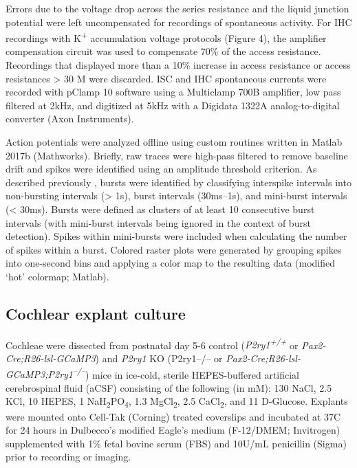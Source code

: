 \documentclass[9pt,lineno]{elife}
\begin{document}
Errors due to the voltage drop across the series resistance and the liquid junction potential were left uncompensated for recordings of spontaneous activity. For IHC recordings with K\textsuperscript{+} accumulation voltage protocols (Figure 4), the amplifier compensation circuit was used to compensate 70\% of the access resistance. Recordings that displayed more than a 10\% increase in access resistance or access resistances > 30 M\textohm \hspace{0.5mm} were discarded. ISC and IHC spontaneous currents were recorded with pClamp 10 software using a Multiclamp 700B amplifier, low pass filtered at 2kHz, and digitized at 5kHz with a Digidata 1322A analog-to-digital converter (Axon Instruments).

Action potentials were analyzed offline using custom routines written in Matlab 2017b (Mathworks). Briefly, raw traces were high-pass filtered to remove baseline drift and spikes were identified using an amplitude threshold criterion. As described previously \citep{Tritsch2010a}, bursts were identified by classifying interspike intervals into non-bursting intervals (> 1s), burst intervals (30ms--1s), and mini-burst intervals (< 30ms). Bursts were defined as clusters of at least 10 consecutive burst intervals (with mini-burst intervals being ignored in the context of burst detection). Spikes within mini-bursts were included when calculating the number of spikes within a burst. Colored raster plots were generated by grouping spikes into one-second bins and applying a color map to the resulting data (modified ‘hot’ colormap; Matlab).

\subsection{Cochlear explant culture}
Cochleae were dissected from postnatal day 5-6 control (\textit{P2ry1\textsuperscript{+/+}} or \textit{Pax2-Cre;R26-lsl-GCaMP3}) and \textit{P2ry1} KO (P2ry1–/– or \textit{Pax2-Cre;R26-lsl-GCaMP3;P2ry1\textsuperscript{–/–}}) mice in ice-cold, sterile HEPES-buffered artificial cerebrospinal fluid (aCSF) consisting of the following (in mM): 130 NaCl, 2.5 KCl, 10 HEPES, 1 NaH\textsubscript{2}PO\textsubscript{4}, 1.3 MgCl\textsubscript{2}, 2.5 CaCl\textsubscript{2}, and 11 D-Glucose. Explants were mounted onto Cell-Tak (Corning) treated coverslips and incubated at 37\textdegree C for 24 hours in Dulbecco’s modified Eagle’s medium (F-12/DMEM; Invitrogen) supplemented with 1\% fetal bovine serum (FBS) and 10U/mL penicillin (Sigma) prior to recording or imaging. 
\end{document}
